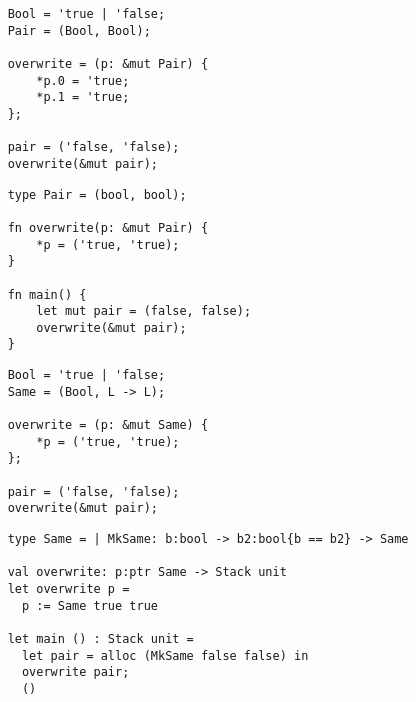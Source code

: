 \documentclass[12pt,twoside]{report}
\begin{document}



\clearpage{\pagestyle{empty}\cleardoublepage}
\setcounter{page}{1}
\pagestyle{fancy}


\begin{verbatim}
    Bool = 'true | 'false;
    Pair = (Bool, Bool);

    overwrite = (p: &mut Pair) {
        *p.0 = 'true;
        *p.1 = 'true;
    };

    pair = ('false, 'false);
    overwrite(&mut pair);
\end{verbatim}

\begin{verbatim}
    type Pair = (bool, bool);

    fn overwrite(p: &mut Pair) {
        *p = ('true, 'true);
    }

    fn main() {
        let mut pair = (false, false);
        overwrite(&mut pair);
    }
\end{verbatim}

\begin{verbatim}
    Bool = 'true | 'false;
    Same = (Bool, L -> L);

    overwrite = (p: &mut Same) {
        *p = ('true, 'true);
    };

    pair = ('false, 'false);          
    overwrite(&mut pair);
\end{verbatim}

\begin{verbatim}
    type Same = | MkSame: b:bool -> b2:bool{b == b2} -> Same

    val overwrite: p:ptr Same -> Stack unit
    let overwrite p =
      p := Same true true
      
    let main () : Stack unit =
      let pair = alloc (MkSame false false) in
      overwrite pair;
      ()
\end{verbatim}
\end{document}
